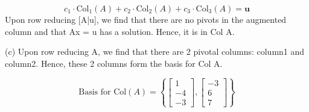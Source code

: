 \documentclass{article}
\begin{document}
\begin{enumerate}
\[
c_1 \cdot \text{Col}_1(A) + c_2 \cdot \text{Col}_2(A) + c_3 \cdot \text{Col}_3(A) = \mathbf{u}
\]
 Upon row reducing [A|u], we find that there are no pivots in the augmented column and that Ax = u has a solution. Hence, it is in Col A.

 (c) Upon row reducing A, we find that there are 2 pivotal columns: column1 and column2. Hence, these 2 columns form the basis for Col A. 

\[
\text{Basis for $\text{Col}(A)$} = \left\{ \begin{bmatrix} 1 \\ -4 \\ -3 \end{bmatrix}, \begin{bmatrix} -3 \\ 6 \\ 7 \end{bmatrix} \right\}
\]

    
    
\end{enumerate}
\end{document}

